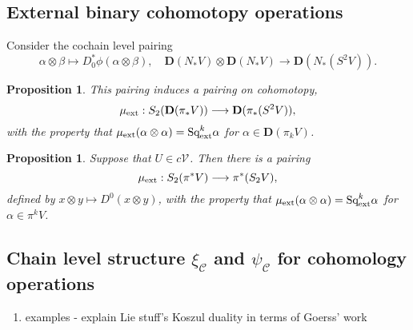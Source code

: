 \documentclass[11pt]{amsart}
\theoremstyle{plain}
\newtheorem{prop}[thm]{Proposition}
\theoremstyle{definition}
\let\oldphi\phi
\let\phi\varphi
\renewcommand{\to}{\longrightarrow}
\newcommand{\calV}{\mathcal{V}}
\newcommand{\calc}{\mathcal{C}}
\theoremstyle{plain}
\newcommand{\vect}[2]{\calV^{#1}_{#2}}
\newcommand{\ExtCohOp}{\textup{Sq}_\textup{ext}}
\newcommand{\ExtCohProd}{\mu_\textup{ext}}
\newcommand{\dual}{\mathbf{D}}
\begin{document}
\begin{Constructing (co)homotopy operations}
\subsection{External binary cohomotopy operations}
Consider the cochain level pairing
\[\alpha\otimes\beta\mapsto D_0^*\oldphi(\alpha\otimes\beta),\quad\dual(N_*V)\otimes \dual(N_*V)\to \dual(N_*(S^2V)).\]
\begin{prop}\label{the external cohomotopy pairing}
This pairing induces a pairing on cohomotopy,
\[\ExtCohProd:S_2(\dual(\pi_*V))\to \dual(\pi_*(S^2V)),\]
with the property that $\ExtCohProd(\alpha\otimes \alpha)=\ExtCohOp^k\alpha$ for $\alpha\in\dual(\pi_kV)$.
\end{prop}
\begin{shaded}
\begin{prop}\label{the external cohomotopy pairing}
Suppose that $U\in c\vect{}{}$. Then there is a pairing
\[\ExtCohProd:S_2(\pi^*V)\to \pi^*(S_2V),\]
defined by $x\otimes y\mapsto D^0(x\otimes y)$,
with the property that $\ExtCohProd(\alpha\otimes \alpha)=\ExtCohOp^k\alpha$ for $\alpha\in \pi^kV$.
\end{prop}
\end{shaded}


\subsection{Chain level structure $\xi_\calc $ and $\psi_\calc$ for cohomology operations}\label{chain level structure}
\hfil
\begin{shaded}
\begin{enumerate}
\item examples - explain Lie stuff's Koszul duality in terms of Goerss' work
\end{enumerate}
\end{shaded}



\end{Constructing (co)homotopy operations}
\end{document}
